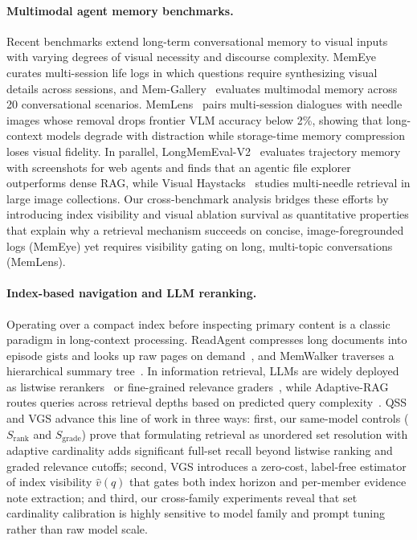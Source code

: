 \documentclass[10pt]{article}
\newcommand{\qss}{QSS}
\begin{document}
\paragraph{Multimodal agent memory benchmarks.} Recent benchmarks extend long-term conversational memory to visual inputs with varying degrees of visual necessity and discourse complexity. MemEye~\citep{guo2026memeye} curates multi-session life logs in which questions require synthesizing visual details across sessions, and Mem-Gallery~\citep{bei2026memgallery} evaluates multimodal memory across 20 conversational scenarios. MemLens~\citep{ren2026memlens} pairs multi-session dialogues with needle images whose removal drops frontier VLM accuracy below 2\%, showing that long-context models degrade with distraction while storage-time memory compression loses visual fidelity. In parallel, LongMemEval-V2~\citep{wu2026lmev2} evaluates trajectory memory with screenshots for web agents and finds that an agentic file explorer outperforms dense RAG, while Visual Haystacks~\citep{wu2025visualhaystacks} studies multi-needle retrieval in large image collections. Our cross-benchmark analysis bridges these efforts by introducing index visibility and visual ablation survival as quantitative properties that explain why a retrieval mechanism succeeds on concise, image-foregrounded logs (MemEye) yet requires visibility gating on long, multi-topic conversations (MemLens).

\paragraph{Index-based navigation and LLM reranking.} Operating over a compact index before inspecting primary content is a classic paradigm in long-context processing. ReadAgent compresses long documents into episode gists and looks up raw pages on demand~\citep{lee2024readagent}, and MemWalker traverses a hierarchical summary tree~\citep{chen2023memwalker}. In information retrieval, LLMs are widely deployed as listwise rerankers~\citep{sun2023rankgpt} or fine-grained relevance graders~\citep{zhuang2024beyond}, while Adaptive-RAG routes queries across retrieval depths based on predicted query complexity~\citep{jeong2024adaptiverag}. \qss{} and VGS advance this line of work in three ways: first, our same-model controls ($S_{\mathrm{rank}}$ and $S_{\mathrm{grade}}$) prove that formulating retrieval as unordered set resolution with adaptive cardinality adds significant full-set recall beyond listwise ranking and graded relevance cutoffs; second, VGS introduces a zero-cost, label-free estimator of index visibility $\hat{v}(q)$ that gates both index horizon and per-member evidence note extraction; and third, our cross-family experiments reveal that set cardinality calibration is highly sensitive to model family and prompt tuning rather than raw model scale.
\end{document}
